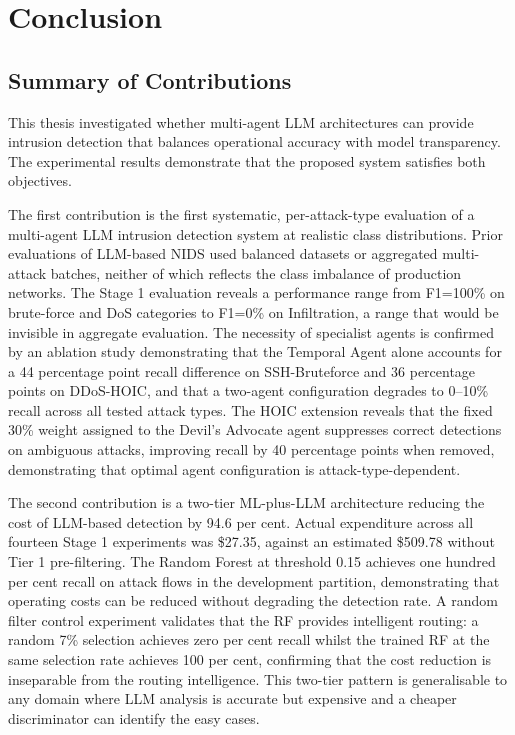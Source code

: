 \documentclass[../main.tex]{subfiles}
\begin{document}
\chapter{Conclusion}
\label{ch:conclusion}

\section{Summary of Contributions}

This thesis investigated whether multi-agent LLM architectures can provide intrusion detection that balances operational accuracy with model transparency. The experimental results demonstrate that the proposed system satisfies both objectives.

The first contribution is the first systematic, per-attack-type evaluation of a multi-agent LLM intrusion detection system at realistic class distributions. Prior evaluations of LLM-based NIDS used balanced datasets or aggregated multi-attack batches, neither of which reflects the class imbalance of production networks. The Stage 1 evaluation reveals a performance range from F1=100\% on brute-force and DoS categories to F1=0\% on Infiltration, a range that would be invisible in aggregate evaluation. The necessity of specialist agents is confirmed by an ablation study demonstrating that the Temporal Agent alone accounts for a 44 percentage point recall difference on SSH-Bruteforce and 36 percentage points on DDoS-HOIC, and that a two-agent configuration degrades to 0--10\% recall across all tested attack types. The HOIC extension reveals that the fixed 30\% weight assigned to the Devil's Advocate agent suppresses correct detections on ambiguous attacks, improving recall by 40 percentage points when removed, demonstrating that optimal agent configuration is attack-type-dependent.

The second contribution is a two-tier ML-plus-LLM architecture reducing the cost of LLM-based detection by 94.6 per cent. Actual expenditure across all fourteen Stage 1 experiments was \$27.35, against an estimated \$509.78 without Tier 1 pre-filtering. The Random Forest at threshold 0.15 achieves one hundred per cent recall on attack flows in the development partition, demonstrating that operating costs can be reduced without degrading the detection rate. A random filter control experiment validates that the RF provides intelligent routing: a random 7\% selection achieves zero per cent recall whilst the trained RF at the same selection rate achieves 100 per cent, confirming that the cost reduction is inseparable from the routing intelligence. This two-tier pattern is generalisable to any domain where LLM analysis is accurate but expensive and a cheaper discriminator can identify the easy cases.
\end{document}
